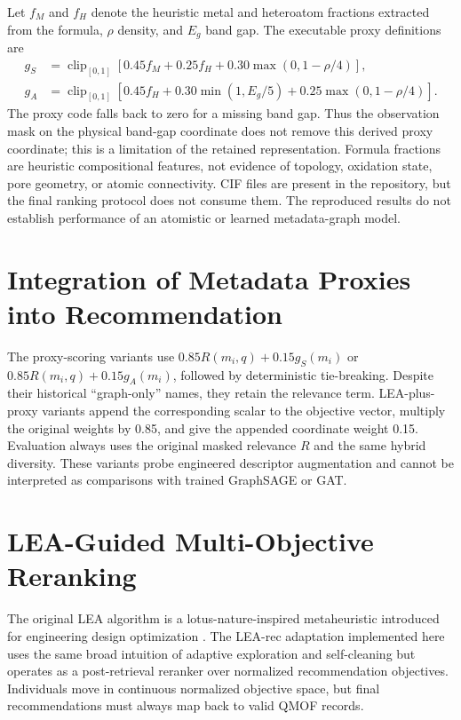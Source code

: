 \documentclass[12pt,a4paper]{article}
\begin{document}
Let $f_M$ and $f_H$ denote the heuristic metal and heteroatom fractions extracted from the formula, $\rho$ density, and $E_g$ band gap. The executable proxy definitions are
\begin{align}
g_S &= \operatorname{clip}_{[0,1]}[0.45f_M+0.25f_H+0.30\max(0,1-\rho/4)],\\
g_A &= \operatorname{clip}_{[0,1]}[0.45f_H+0.30\min(1,E_g/5)+0.25\max(0,1-\rho/4)].
\end{align}
The proxy code falls back to zero for a missing band gap. Thus the observation mask on the physical band-gap coordinate does not remove this derived proxy coordinate; this is a limitation of the retained representation. Formula fractions are heuristic compositional features, not evidence of topology, oxidation state, pore geometry, or atomic connectivity. CIF files are present in the repository, but the final ranking protocol does not consume them. The reproduced results do not establish performance of an atomistic or learned metadata-graph model.

\section{Integration of Metadata Proxies into Recommendation}
\label{sec:graph_int}

The proxy-scoring variants use $0.85R(m_i,q)+0.15g_S(m_i)$ or $0.85R(m_i,q)+0.15g_A(m_i)$, followed by deterministic tie-breaking. Despite their historical ``graph-only'' names, they retain the relevance term. LEA-plus-proxy variants append the corresponding scalar to the objective vector, multiply the original weights by 0.85, and give the appended coordinate weight 0.15. Evaluation always uses the original masked relevance $R$ and the same hybrid diversity. These variants probe engineered descriptor augmentation and cannot be interpreted as comparisons with trained GraphSAGE or GAT.

\section{LEA-Guided Multi-Objective Reranking}
\label{sec:lea}

The original LEA algorithm is a lotus-nature-inspired metaheuristic introduced for engineering design optimization \cite{dalirinia2024}. The LEA-rec adaptation implemented here uses the same broad intuition of adaptive exploration and self-cleaning but operates as a post-retrieval reranker over normalized recommendation objectives. Individuals move in continuous normalized objective space, but final recommendations must always map back to valid QMOF records.
\end{document}
